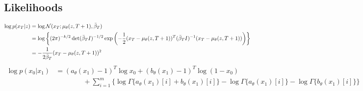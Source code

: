 \subsection{Likelihoods}
\begin{align}
    \log p(x_T|z)
    &= \log\mathcal N(x_T;\mu_\theta(z,T+1), \bar\beta_T)
    \\
    &=\log \left\{(2\pi)^{-k/2}\det(\bar\beta_TI)^{-1/2}\exp\left(-\frac{1}{2}(x_T-\mu_\theta(z,T+1))^T(\bar\beta_TI)^{-1}(x_T-\mu_\theta(z,T+1))\right)\right\}
    \\
    &=
    -\frac{1}{2 \bar\beta_T}(x_T-\mu_\theta(z,T+1))^2
    \\
\end{align}
\begin{align}
    \log p(x_0|x_1)
    &=
    (a_\theta(x_1)-1)^T\log x_0
    +
    (b_\theta(x_1)-1)^T\log (1-x_0)
    \\
    &\qquad\qquad
    +\sum_{i=1}^m\bigg\{
    \log\Gamma\big\{a_\theta(x_1)[i] + b_\theta(x_1)[i]\big\}
    -
    \log \Gamma\big\{a_\theta(x_1)[i]\big\}
    -
    \log\Gamma\big\{ b_\theta(x_1)[i]\big\}
    \bigg\}
\end{align}